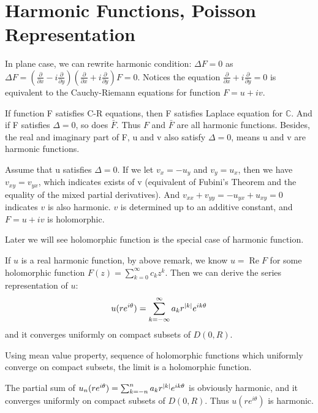 \section{Harmonic Functions, Poisson Representation}
In plane case, we can rewrite harmonic condition: $\Delta F=0$ as
$\Delta F=(\frac{\partial}{\partial x}-i\frac{\partial}{\partial y})(\frac{\partial}{\partial x}+i\frac{\partial}{\partial y})F=0$. Notices the equation $\frac{\partial}{\partial x}+i\frac{\partial}{\partial y}=0$ is equivalent to the Cauchy-Riemann equations for function $F=u+iv$.\par
\begin{remark}
    If function F satisfies C-R equations, then F satisfies Laplace equation for $\mathbb{C}$. And if F satisfies $\Delta=0$, so does $\bar{F}$. Thus $F$ and $\bar{F}$ are all harmonic functions.
    Besides, the real and imaginary part of F, u and v also satisfy $\Delta=0$, means u and v are harmonic functions.
\end{remark}
\begin{remark}
    Assume that u satisfies $\Delta=0$. If we let $v_x=-u_y$ and $v_y=u_x$, then we have $v_{xy}=v_{yx}$, which indicates exists of v (equivalent of
    Fubini's Theorem and the equality of the mixed partial derivatives). And $v_{xx}+v_{yy}=-u_{yx}+u_{xy}=0$ indicates $v$ is also
    harmonic. $v$ is determined up to an additive constant, and $F=u+iv$ is holomorphic.
\end{remark}
\begin{remark}
    Later we will see holomorphic function is the special case of harmonic function.
\end{remark}
If $u$ is a real harmonic function, by above remark, we know $u=\operatorname{Re}{F}$ for some holomorphic function $F(z)=\sum_{k=0}^{\infty}{c_k z^k}$. Then we can derive the series representation of $u$:
\begin{equation}\label{series of harmonic function}
    u(re^{i\theta})=\sum_{k=-\infty}^\infty{a_kr^{\left\lvert k\right\rvert}e^{i k\theta}}
\end{equation}
and {\color{blue}it converges uniformly on compact subsets of $D(0,R)$}.
\begin{remark}
    Using mean value property, sequence of holomorphic functions which uniformly converge on compact subsets, the limit is a holomorphic function. \par
    The partial sum of $u_n(re^{i\theta})=\sum_{k=-n}^n{a_kr^{\left\lvert k\right\rvert}e^{i k\theta}}$ is obviously harmonic, and it converges uniformly on compact subsets of $D(0,R)$. Thus $u(re^{i\theta})$ is harmonic.
\end{remark}\par


